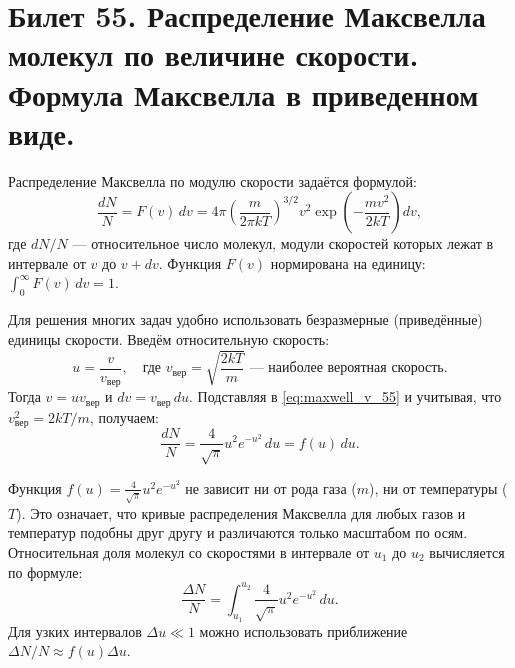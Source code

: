\section{Билет 55. Распределение Максвелла молекул по величине скорости. Формула Максвелла в приведенном виде.}

\begin{definition}
Распределение Максвелла по модулю скорости задаётся формулой:
\begin{equation}
    \frac{dN}{N} = F(v) \, dv = 4\pi \left( \frac{m}{2\pi k T} \right)^{3/2} v^2 \exp\left( -\frac{m v^2}{2 k T} \right) dv, \label{eq:maxwell_v_55}
\end{equation}
где $dN/N$ --- относительное число молекул, модули скоростей которых лежат в интервале от $v$ до $v+dv$. Функция $F(v)$ нормирована на единицу: $\int_0^\infty F(v) \, dv = 1$.
\end{definition}

\begin{definition}
Для решения многих задач удобно использовать безразмерные (приведённые) единицы скорости. Введём относительную скорость:
\begin{equation}
    u = \frac{v}{v_{\text{вер}}}, \quad \text{где } v_{\text{вер}} = \sqrt{\frac{2kT}{m}} \text{ --- наиболее вероятная скорость.}
\end{equation}
Тогда $v = u v_{\text{вер}}$ и $dv = v_{\text{вер}} \, du$. Подставляя в \eqref{eq:maxwell_v_55} и учитывая, что $v_{\text{вер}}^2 = 2kT/m$, получаем:
\begin{equation}
    \frac{dN}{N} = \frac{4}{\sqrt{\pi}} u^2 e^{-u^2} \, du = f(u) \, du. \label{eq:reduced_maxwell}
\end{equation}
\end{definition}

\begin{property}
Функция $f(u) = \frac{4}{\sqrt{\pi}} u^2 e^{-u^2}$ не зависит ни от рода газа ($m$), ни от температуры ($T$). Это означает, что кривые распределения Максвелла для любых газов и температур подобны друг другу и различаются только масштабом по осям.
Относительная доля молекул со скоростями в интервале от $u_1$ до $u_2$ вычисляется по формуле:
\begin{equation}
    \frac{\Delta N}{N} = \int_{u_1}^{u_2} \frac{4}{\sqrt{\pi}} u^2 e^{-u^2} \, du.
\end{equation}
Для узких интервалов $\Delta u \ll 1$ можно использовать приближение $\Delta N/N \approx f(u) \Delta u$.
\end{property}

